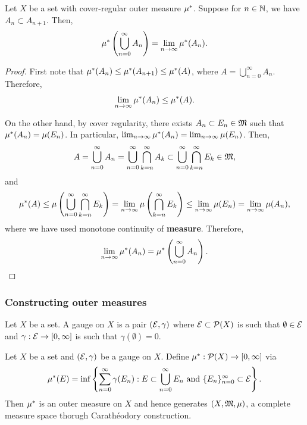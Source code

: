 \documentclass[a4paper]{article}
\renewcommand{\cupinfn}{\bigcup_{n=0}^\infty}
\renewcommand{\suminfn}{\sum_{n=0}^\infty}
\renewcommand{\seqinfn}[1]{\{ #1 \}_{n=0}^\infty}
\begin{document}
\begin{prop}
  Let $X$ be a set with cover-regular outer measure $\mu^*$. Suppose for $n
    \in \mathbb{N}$, we have $A_n \subset A_{n+1}$. Then,
  \[
    \om \left( \cupinfn A_n \right)
    = \lim_{n \to \infty} \om(A_n).
  \]
\end{prop}

\begin{proof}
  First note that $\mu^*(A_n) \leq \mu^*(A_{n+1}) \leq \mu^*(A)$, where $A =
    \cupinfn A_n$. Therefore,
  \[
    \lim_{n \to \infty} \mu^*(A_n) \leq \mu^*(A).
  \]

  On the other hand, by cover regularity, there exists $A_n \subset E_n
  \in \mathfrak{M}$ such that $\mu^*(A_n) = \mu(E_n)$. In particular, $\lim_{n \to
  \infty} \mu^* (A_n) = \lim_{n \to \infty} \mu(E_n)$. Then,
  \[
    A = \cupinfn A_n = \cupinfn \bigcap_{k=n}^\infty A_k
    \subset \cupinfn \bigcap_{k=n}^\infty E_k \in \mf,
  \]
  and
  \[
    \begin{aligned}
      \om(A)
      \leq \mu \left( \cupinfn
      \bigcap_{k=n}^\infty E_k \right)
      = \lim_{n \to \infty} \mu \left( \bigcap_{k=n}^\infty
      E_k \right)
      \leq \lim_{n \to \infty} \mu (E_n)
      = \lim_{n \to \infty} \mu(A_n),
    \end{aligned}
  \]
  where we have used monotone continuity of \textbf{measure}. Therefore,
  \[
    \lim_{n \to \infty} \om (A_n) = \om
    \left( \cupinfn A_n \right).
  \]
\end{proof}

\subsubsection{Constructing outer measures}

\begin{defi}
  Let $X$ be a set. A gauge on $X$ is a pair $(\mathcal{E}, \gamma)$ where
  $\mathcal{E} \subset \mathcal{P}(X)$ is such that $\emptyset \in \mathcal{E}$ and $\gamma :
    \mathcal{E} \to [0, \infty]$ is such that $\gamma(\emptyset) = 0$.
\end{defi}

\begin{thm}
  Let $X$ be a set and $(\mathcal{E}, \gamma)$ be a gauge on $X$. Define $\mu^*:
    \mathcal{P}(X) \to [0, \infty]$ via
  \[
    \om(E) = \inf \left\{ \suminfn \gamma(E_n):
    E \subset \cupinfn E_n \text{ and }
    \seqinfn{E_n} \subset \ecal \right\}.
  \]
  Then $\mu^*$ is an outer measure on $X$ and hence generates $(X, \mathfrak{M},
  \mu)$, a complete measure space thorugh Carath\'eodory construction.
\end{thm}
\end{document}
